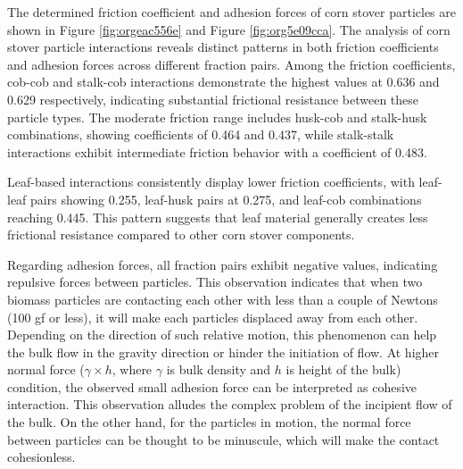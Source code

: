 \documentclass[xcolor=dvipsnames,10pt,hidelinks]{article}
\begin{document}
The determined friction coefficient and adhesion forces of corn stover particles are shown in Figure \ref{fig:orgeac556e} and Figure \ref{fig:org5e09cca}.
The analysis of corn stover particle interactions reveals distinct patterns in both friction coefficients and adhesion forces across different fraction pairs. Among the friction coefficients, cob-cob and stalk-cob interactions demonstrate the highest values at 0.636 and 0.629 respectively, indicating substantial frictional resistance between these particle types. The moderate friction range includes husk-cob and stalk-husk combinations, showing coefficients of 0.464 and 0.437, while stalk-stalk interactions exhibit intermediate friction behavior with a coefficient of 0.483.

Leaf-based interactions consistently display lower friction coefficients, with leaf-leaf pairs showing 0.255, leaf-husk pairs at 0.275, and leaf-cob combinations reaching 0.445. This pattern suggests that leaf material generally creates less frictional resistance compared to other corn stover components.

Regarding adhesion forces, all fraction pairs exhibit negative values, indicating repulsive forces between particles.
This observation indicates that when two biomass particles are contacting each other with less than a couple of Newtons (100 gf or less),
it will make each particles displaced away from each other.
Depending on the direction of such relative motion, this phenomenon can help the bulk flow in the gravity direction or hinder the initiation of flow.
At higher normal force (\(\gamma\times h\), where \(\gamma\) is bulk density and \(h\) is height of the bulk) condition,
the observed small adhesion force can be interpreted as cohesive interaction.
This observation alludes the complex problem of the incipient flow of the bulk.
On the other hand, for the particles in motion, the normal force between particles can be thought to be minuscule, which will make the contact cohesionless.
\end{document}
